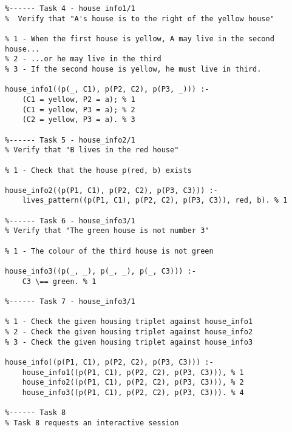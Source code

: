 \documentclass[11pt]{article}
\begin{document}
\newpage
\begin{verbatim}
%------ Task 4 - house info1/1
%  Verify that "A's house is to the right of the yellow house"

% 1 - When the first house is yellow, A may live in the second house...
% 2 - ...or he may live in the third
% 3 - If the second house is yellow, he must live in third. 

house_info1((p(_, C1), p(P2, C2), p(P3, _))) :-
    (C1 = yellow, P2 = a); % 1
    (C1 = yellow, P3 = a); % 2
    (C2 = yellow, P3 = a). % 3
   
%------ Task 5 - house_info2/1
% Verify that "B lives in the red house"

% 1 - Check that the house p(red, b) exists

house_info2((p(P1, C1), p(P2, C2), p(P3, C3))) :-
    lives_pattern((p(P1, C1), p(P2, C2), p(P3, C3)), red, b). % 1

%------ Task 6 - house_info3/1
% Verify that "The green house is not number 3"

% 1 - The colour of the third house is not green

house_info3((p(_, _), p(_, _), p(_, C3))) :-
    C3 \== green. % 1

%------ Task 7 - house_info3/1

% 1 - Check the given housing triplet against house_info1
% 2 - Check the given housing triplet against house_info2
% 3 - Check the given housing triplet against house_info3

house_info((p(P1, C1), p(P2, C2), p(P3, C3))) :-
    house_info1((p(P1, C1), p(P2, C2), p(P3, C3))), % 1
    house_info2((p(P1, C1), p(P2, C2), p(P3, C3))), % 2
    house_info3((p(P1, C1), p(P2, C2), p(P3, C3))). % 4

%------ Task 8
% Task 8 requests an interactive session
\end{verbatim}
\end{document}
